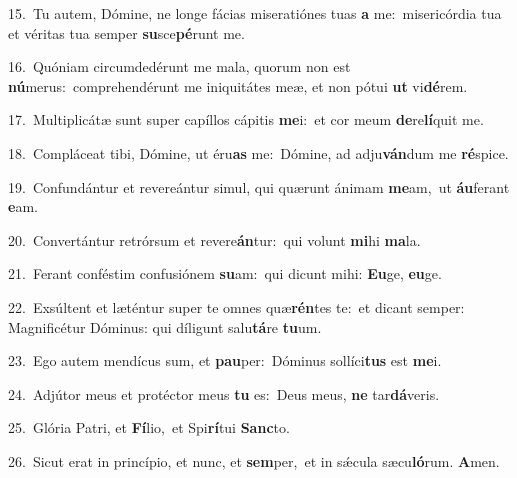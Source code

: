 {\numbfont\textcolor{\numbcolor}{15.}}~Tu autem, Dómine, ne longe fácias miseratiónes tuas \textbf{a} me:~\star misericórdia tua et véritas tua semper \textbf{su}\-sce\-\textbf{pé}\-runt me.\par
{\numbfont\textcolor{\numbcolor}{16.}}~Quóniam circumdedérunt me mala, quorum non est \textbf{nú}\-merus:~\star comprehendérunt me iniquitátes meæ, et non pótui \textbf{ut} vi\-\textbf{dé}\-rem.\par
{\numbfont\textcolor{\numbcolor}{17.}}~Multiplicátæ sunt super capíllos cápitis \textbf{me}\-i:~\star et cor meum \textbf{de}\-re\-\textbf{lí}\-quit me.\par
{\numbfont\textcolor{\numbcolor}{18.}}~Compláceat tibi, Dómine, ut éru\textbf{as} me:~\star Dómine, ad adju\-\textbf{ván}\-dum me \textbf{ré}\-spice.\par
{\numbfont\textcolor{\numbcolor}{19.}}~Confundántur et revereántur simul, qui quærunt ánimam \textbf{me}\-am,~\star ut \textbf{áu}\-ferant \textbf{e}\-am.\par
{\numbfont\textcolor{\numbcolor}{20.}}~Convertántur retrórsum et revere\-\textbf{án}\-tur:~\star qui volunt \textbf{mi}\-hi \textbf{ma}\-la.\par
{\numbfont\textcolor{\numbcolor}{21.}}~Ferant conféstim confusiónem \textbf{su}\-am:~\star qui dicunt mihi: \textbf{Eu}\-ge, \textbf{eu}\-ge.\par
{\numbfont\textcolor{\numbcolor}{22.}}~Exsúltent et læténtur super te omnes quæ\-\textbf{rén}\-tes te:~\star et dicant semper: Magnificétur Dóminus: qui díligunt salu\-\textbf{tá}\-re \textbf{tu}\-um.\par
{\numbfont\textcolor{\numbcolor}{23.}}~Ego autem mendícus sum, et \textbf{pau}\-per:~\star Dóminus sollíci\textbf{tus} est \textbf{me}\-i.\par
{\numbfont\textcolor{\numbcolor}{24.}}~Adjútor meus et protéctor meus \textbf{tu} es:~\star Deus meus, \textbf{ne} tar\-\textbf{dá}\-veris.\par
{\numbfont\textcolor{\numbcolor}{25.}}~Glória Patri, et \textbf{Fí}\-lio,~\star et Spi\-\textbf{rí}\-tui \textbf{Sanc}\-to.\par
{\numbfont\textcolor{\numbcolor}{26.}}~Sicut erat in princípio, et nunc, et \textbf{sem}\-per,~\star et in sǽcula sæcu\-\textbf{ló}\-rum. \textbf{A}\-men.\par
